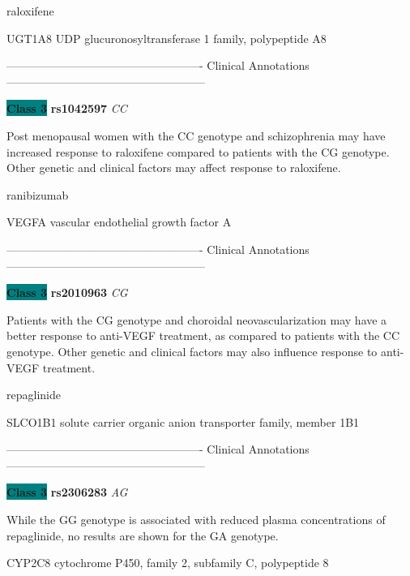 \documentclass{resume} %
\begin{document}
\begin{rSection}{ raloxifene }
\begin{rSubsection}{ UGT1A8 }{ UDP glucuronosyltransferase 1 family, polypeptide A8 }{}{}
\item[] ---------------------------------------------------- Clinical Annotations -----------------------------------------------------\newline
\item \textbf{\colorbox{teal} {Class 3}} \textbf{ rs1042597 } \textit{ CC }
\item[] Post menopausal women with the CC genotype and schizophrenia may have increased response to raloxifene compared to patients with the CG genotype. Other genetic and clinical factors may affect response to raloxifene. 
\end{rSubsection}

\end{rSection}\begin{rSection}{ ranibizumab }
\item[]

\begin{rSubsection}{ VEGFA }{ vascular endothelial growth factor A }{}{}
\item[]

\item[] ---------------------------------------------------- Clinical Annotations -----------------------------------------------------\newline
\item \textbf{\colorbox{teal} {Class 3}} \textbf{ rs2010963 } \textit{ CG }
\item[] Patients with the CG genotype and choroidal neovascularization may have a better response to anti-VEGF treatment, as compared to patients with the CC genotype. Other genetic and clinical factors may also influence response to anti-VEGF treatment. 
\end{rSubsection}

\end{rSection}\begin{rSection}{ repaglinide }
\item[]

\begin{rSubsection}{ SLCO1B1 }{ solute carrier organic anion transporter family, member 1B1 }{}{}
\item[]

\item[] ---------------------------------------------------- Clinical Annotations -----------------------------------------------------\newline
\item \textbf{\colorbox{teal} {Class 3}} \textbf{ rs2306283 } \textit{ AG }
\item[] While the GG genotype is associated with reduced plasma concentrations of repaglinide, no results are shown for the GA genotype.
\end{rSubsection}\begin{rSubsection}{ CYP2C8 }{ cytochrome P450, family 2, subfamily C, polypeptide 8 }{}{}
\item[]


\end{rSubsection}
\end{rSection}
\end{document}
